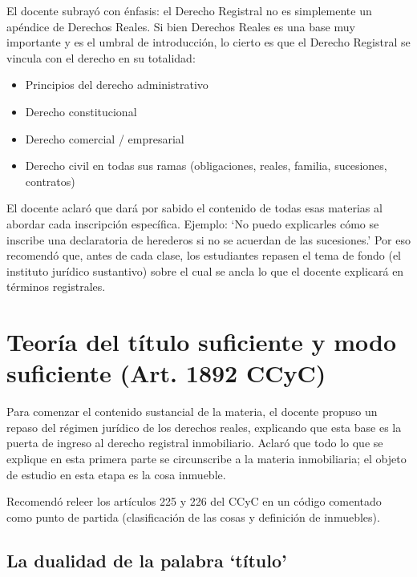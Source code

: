 \documentclass[12pt,oneside]{book}
\begin{document}
El docente subrayó con énfasis: el Derecho Registral no es simplemente un apéndice de Derechos Reales. Si bien Derechos Reales es una base muy importante y es el umbral de introducción, lo cierto es que el Derecho Registral se vincula con el derecho en su totalidad:

\begin{itemize}
    \item Principios del derecho administrativo
    \item Derecho constitucional
    \item Derecho comercial / empresarial
    \item Derecho civil en todas sus ramas (obligaciones, reales, familia, sucesiones, contratos)
\end{itemize}

El docente aclaró que dará por sabido el contenido de todas esas materias al abordar cada inscripción específica. Ejemplo: `No puedo explicarles cómo se inscribe una declaratoria de herederos si no se acuerdan de las sucesiones.' Por eso recomendó que, antes de cada clase, los estudiantes repasen el tema de fondo (el instituto jurídico sustantivo) sobre el cual se ancla lo que el docente explicará en términos registrales.


\chapter{Teoría del título suficiente y modo suficiente (Art. 1892 CCyC)}
\label{chap:titulo-modo}

Para comenzar el contenido sustancial de la materia, el docente propuso un repaso del régimen jurídico de los derechos reales, explicando que esta base es la puerta de ingreso al derecho registral inmobiliario. Aclaró que todo lo que se explique en esta primera parte se circunscribe a la materia inmobiliaria; el objeto de estudio en esta etapa es la cosa inmueble.

Recomendó releer los artículos 225 y 226 del CCyC en un código comentado como punto de partida (clasificación de las cosas y definición de inmuebles).

\section{La dualidad de la palabra `título'}
\label{sec:dualidad-titulo}
\end{document}

